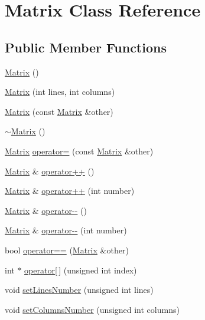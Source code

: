 \hypertarget{class_matrix}{\section{Matrix Class Reference}
\label{class_matrix}
}
\subsection*{Public Member Functions}
\begin{DoxyCompactItemize}
\item 
\hyperlink{class_matrix_a2dba13c45127354c9f75ef576f49269b}{Matrix} ()
\item 
\hyperlink{class_matrix_ad74c6b0c2db846ab723754759c52dad6}{Matrix} (int lines, int columns)
\item 
\hyperlink{class_matrix_abcf708e864ed3d9db2c3b317c5e529ab}{Matrix} (const \hyperlink{class_matrix}{Matrix} \&other)
\item 
\hyperlink{class_matrix_a9b1c3627f573d78a2f08623fdfef990f}{$\sim$\-Matrix} ()
\item 
\hyperlink{class_matrix}{Matrix} \hyperlink{class_matrix_a26d63d1bb523197df74a89be08a36cda}{operator=} (const \hyperlink{class_matrix}{Matrix} \&other)
\item 
\hyperlink{class_matrix}{Matrix} \& \hyperlink{class_matrix_a8507366342ab66e74b5a14226bf99791}{operator++} ()
\item 
\hyperlink{class_matrix}{Matrix} \& \hyperlink{class_matrix_a61760c9681e9d2d56db2119c48334da0}{operator++} (int number)
\item 
\hyperlink{class_matrix}{Matrix} \& \hyperlink{class_matrix_ad408cd4553ebed67bfd3fd5cc17f8423}{operator-\/-\/} ()
\item 
\hyperlink{class_matrix}{Matrix} \& \hyperlink{class_matrix_af0781e207002c53ba55d2f2609b3de05}{operator-\/-\/} (int number)
\item 
bool \hyperlink{class_matrix_a1e08ad098ff5d0a8022d5c735f01c4cb}{operator==} (\hyperlink{class_matrix}{Matrix} \&other)
\item 
int $\ast$ \hyperlink{class_matrix_a583f72a63d862f837281c1bc765a1cef}{operator\mbox{[}$\,$\mbox{]}} (unsigned int index)
\item 
void \hyperlink{class_matrix_a2ef1bcce25b5c796ac9dadf002c7ddbc}{set\-Lines\-Number} (unsigned int lines)
\item 
void \hyperlink{class_matrix_a8faf7bdf85069f6e15f16f854c28621b}{set\-Columns\-Number} (unsigned int columns)
\item 

\end{DoxyCompactItemize}
